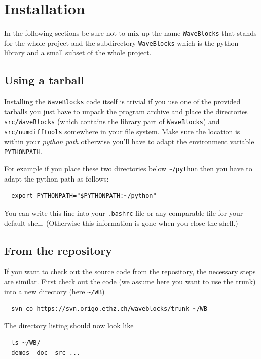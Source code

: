 \documentclass[a4paper,10pt]{report}
\begin{document}
\section{Installation}

In the following sections be sure not to mix up the name \texttt{WaveBlocks}
that stands for the whole project and the subdirectory \texttt{WaveBlocks}
which is the python library and a small subset of the whole project.

\subsection*{Using a tarball}

Installing the \texttt{WaveBlocks} code itself is trivial if you use one of the
provided tarballs you just have to unpack the program archive and place the
directories \texttt{src/WaveBlocks} (which contains the library part of \texttt{WaveBlocks})
and \texttt{src/numdifftools} somewhere in your file system. Make sure the
location is within your \textit{python path} otherwise you'll have to adapt the
environment variable \texttt{PYTHONPATH}.

For example if you place these two directories below \verb|~/python| then you have
to adapt the python path as follows:

\begin{verbatim}
  export PYTHONPATH="$PYTHONPATH:~/python"
\end{verbatim}

You can write this line into your \texttt{.bashrc} file or any comparable file
for your default shell. (Otherwise this information is gone when you close the
shell.)

\subsection*{From the repository}

If you want to check out the source code from the repository, the necessary
steps are similar. First check out the code (we assume here you want to use
the trunk) into a new directory (here \verb|~/WB|)

\begin{verbatim}
  svn co https://svn.origo.ethz.ch/waveblocks/trunk ~/WB
\end{verbatim}

The directory listing should now look like

\begin{verbatim}
  ls ~/WB/
  demos  doc  src ...
\end{verbatim}
\end{document}
